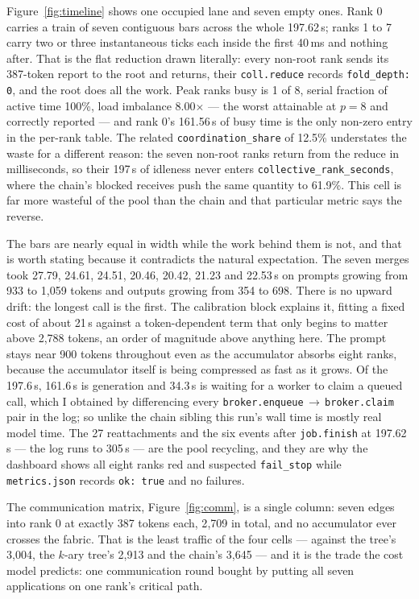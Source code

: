 \documentclass[11pt]{article}
\begin{document}
Figure~\ref{fig:timeline} shows one occupied lane and seven empty ones. Rank 0 carries a
train of seven contiguous bars across the whole 197.62\,s; ranks 1 to 7 carry two or three
instantaneous ticks each inside the first 40\,ms and nothing after. That is the flat
reduction drawn literally: every non-root rank sends its 387-token report to the root and
returns, their \texttt{coll.reduce} records \texttt{fold\_depth: 0}, and the root does all
the work. Peak ranks busy is 1 of 8, serial fraction of active time 100\%, load imbalance
8.00$\times$ --- the worst attainable at $p=8$ and correctly reported --- and rank 0's
161.56\,s of busy time is the only non-zero entry in the per-rank table. The related
\texttt{coordination\_share} of 12.5\% understates the waste for a different reason: the
seven non-root ranks return from the reduce in milliseconds, so their 197\,s of idleness
never enters \texttt{collective\_rank\_seconds}, where the chain's blocked receives push
the same quantity to 61.9\%. This cell is far more wasteful of the pool than the chain and
that particular metric says the reverse.

The bars are nearly equal in width while the work behind them is not, and that is worth
stating because it contradicts the natural expectation. The seven merges took 27.79, 24.61,
24.51, 20.46, 20.42, 21.23 and 22.53\,s on prompts growing from 933 to 1{,}059 tokens and
outputs growing from 354 to 698. There is no upward drift: the longest call is the first.
The calibration block explains it, fitting a fixed cost of about 21\,s against a
token-dependent term that only begins to matter above 2{,}788 tokens, an order of magnitude
above anything here. The prompt stays near 900 tokens throughout even as the accumulator
absorbs eight ranks, because the accumulator itself is being compressed as fast as it
grows. Of the 197.6\,s, 161.6\,s is generation and 34.3\,s is waiting for a worker to claim
a queued call, which I obtained by differencing every
\texttt{broker.enqueue}\,$\to$\,\texttt{broker.claim} pair in the log; so unlike the chain
sibling this run's wall time is mostly real model time. The 27 reattachments and the six
events after \texttt{job.finish} at 197.62\,s --- the log runs to 305\,s --- are the pool
recycling, and they are why the dashboard shows all eight ranks red and suspected
\texttt{fail\_stop} while \texttt{metrics.json} records \texttt{ok: true} and no failures.

The communication matrix, Figure~\ref{fig:comm}, is a single column: seven edges into rank
0 at exactly 387 tokens each, 2{,}709 in total, and no accumulator ever crosses the fabric.
That is the least traffic of the four cells --- against the tree's 3{,}004, the $k$-ary
tree's 2{,}913 and the chain's 3{,}645 --- and it is the trade the cost model predicts: one
communication round bought by putting all seven applications on one rank's critical path.
\end{document}
